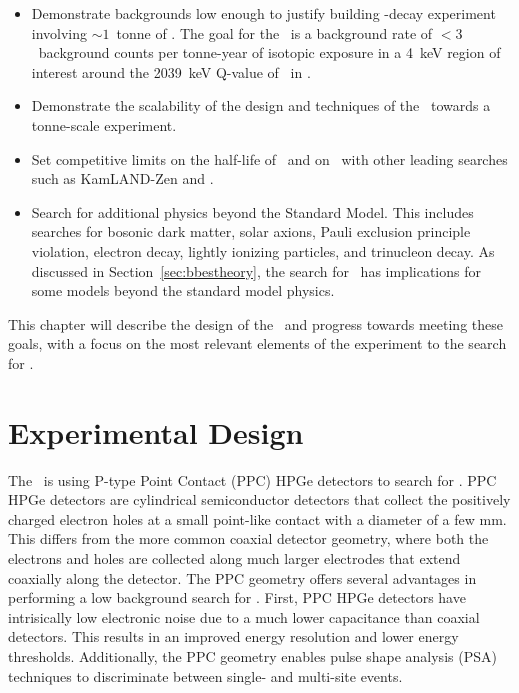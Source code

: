 \documentclass[/main.tex]{subfiles}
\begin{document}
\begin{itemize}
\item Demonstrate backgrounds low enough to justify building \bb -decay experiment involving ${\sim}1$~tonne of . The goal for the \MJD\ is a background rate of $<3$~background counts per tonne-year of isotopic exposure in a 4~keV region of interest around the 2039~keV Q-value of \znbb\ in .
\item Demonstrate the scalability of the design and techniques of the \MJD\ towards a tonne-scale experiment.
\item Set competitive limits on the half-life of \znbb\ and on \mbb\ with other leading searches such as KamLAND-Zen and \Gerda \cite{kamlandzen, gerda}.
\item Search for additional physics beyond the Standard Model. This includes searches for bosonic dark matter, solar axions, Pauli exclusion principle violation, electron decay, lightly ionizing particles, and trinucleon decay\cite{mjdlowE2017, mjdlips2019, mjdtrinuc2019}. As discussed in Section~\ref{sec:bbestheory}, the search for \bbes\ has implications for some models beyond the standard model physics.
\end{itemize}
This chapter will describe the design of the \MJD\ and progress towards meeting these goals, with a focus on the most relevant elements of the experiment to the search for \bbes.

\section{Experimental Design}
The \MJD\ is using P-type Point Contact (PPC)\cite{Luke1989, Barbeau2007} HPGe detectors to search for \znbb.
PPC HPGe detectors are cylindrical semiconductor detectors that collect the positively charged electron holes at a small point-like contact with a diameter of a few mm.
This differs from the more common coaxial detector geometry, where both the electrons and holes are collected along much larger electrodes that extend coaxially along the detector.
The PPC geometry offers several advantages in performing a low background search for \znbb.
First, PPC HPGe detectors have intrisically low electronic noise due to a much lower capacitance than coaxial detectors.
This results in an improved energy resolution and lower energy thresholds.
Additionally, the PPC geometry enables pulse shape analysis (PSA) techniques to discriminate between single- and multi-site events.
\end{document}
